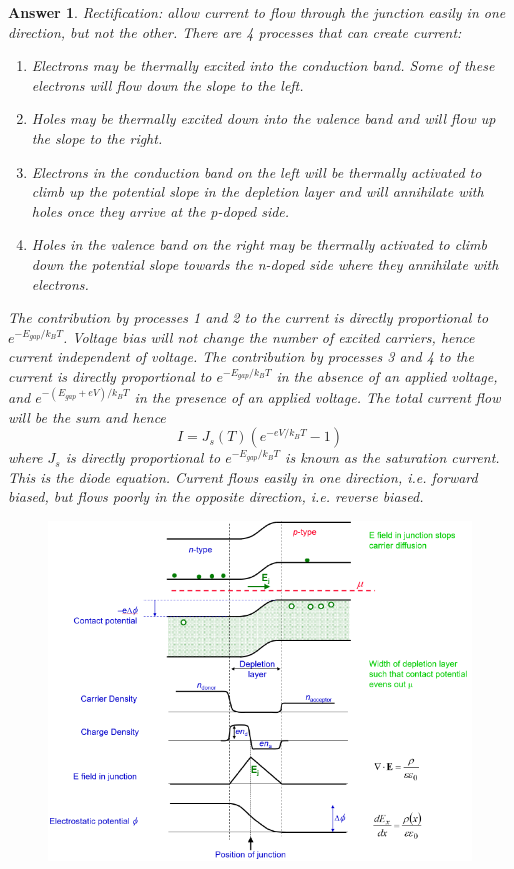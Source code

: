 \documentclass[a4paper]{article}
\newtheorem{ans}{Answer}[subsection]
\theoremstyle{new}
\begin{document}
\begin{ans}
Rectification: allow current to flow through the junction easily in one direction, but not the other. There are 4 processes that can create current:
\begin{enumerate}
    \item Electrons may be thermally excited into the conduction band. Some of these electrons will flow down the slope to the left.
    \item Holes may be thermally excited down into the valence band and will flow up the slope to the right. 
    \item Electrons in the conduction band on the left will be thermally activated to climb up the potential slope in the depletion layer and will annihilate with holes once they arrive at the p-doped side. 
    \item Holes in the valence band on the right may be thermally activated to climb down the potential slope towards the n-doped side where they annihilate with electrons.
\end{enumerate}
The contribution by processes 1 and 2 to the current is directly proportional to $e^{-E_{gap}/k_BT}$. Voltage bias will not change the number of excited carriers, hence current independent of voltage. The contribution by processes 3 and 4 to the current is directly proportional to $e^{-E_{gap}/k_BT}$ in the absence of an applied voltage, and $e^{-(E_{gap}+eV)/k_BT}$ in the presence of an applied voltage. The total current flow will be the sum and hence
$$I=J_s(T)(e^{-eV/k_BT}-1)$$
where $J_s$ is directly proportional to $e^{-E_{gap}/k_BT}$ is known as the saturation current. This is the diode equation. Current flows easily in one direction, i.e. forward biased, but flows poorly in the opposite direction, i.e. reverse biased.
\begin{figure}[H]
    \centering
    \includegraphics[width=\linewidth]{pnjunction.PNG}

\end{figure}
\end{ans}
\end{document}
